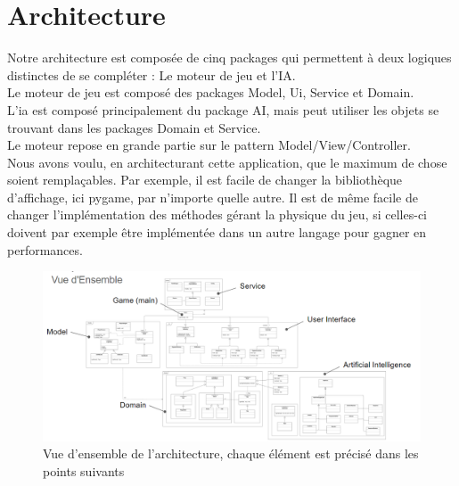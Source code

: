\section{Architecture}

Notre architecture est composée de cinq packages qui permettent à deux logiques distinctes de se compléter : Le moteur de jeu et l'IA.\\

Le moteur de jeu est composé des packages Model, Ui, Service et Domain.\\
L'ia est composé principalement du package AI, mais peut utiliser les objets se trouvant dans les packages Domain et Service.\\

Le moteur repose en grande partie sur le pattern Model/View/Controller.\\

Nous avons voulu, en architecturant cette application, que le maximum de chose soient remplaçables. Par exemple, il est facile de changer la bibliothèque d'affichage, ici pygame, par n'importe quelle autre. Il est de même facile de changer l'implémentation des méthodes gérant la physique du jeu, si celles-ci doivent par exemple être implémentée dans un autre langage pour gagner en performances.\\


\begin{figure}[H]
    \centering
    \includegraphics[scale=0.52,angle=90]{data/archi/vue_ensemble.png}{}
    \caption{Vue d'ensemble de l'architecture, chaque élément est précisé dans les points suivants}
\end{figure}

